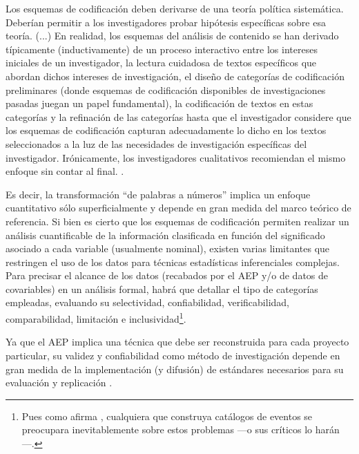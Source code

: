 \documentclass[letterpaper, 11pt]{book}
\theoremstyle{definition}
\theoremstyle{remark}
\begin{document}
\begin{center}
    \begin{minipage}{0.9\linewidth}
        {\setlength{\parindent}{12pt}\small
        Los esquemas de codificación deben derivarse de una teoría política sistemática. Deberían permitir a los investigadores probar hipótesis específicas sobre esa teoría. (...) En realidad, los esquemas del análisis de contenido se han derivado típicamente (inductivamente) de un proceso interactivo entre los intereses iniciales de un investigador, la lectura cuidadosa de textos específicos que abordan dichos intereses de investigación, el diseño de categorías de codificación preliminares (donde esquemas de codificación disponibles de investigaciones pasadas juegan un papel fundamental), la codificación de textos en estas categorías y la refinación de las categorías hasta que el investigador considere que los esquemas de codificación capturan adecuadamente lo dicho en los textos seleccionados a la luz de las necesidades de investigación específicas del investigador. Irónicamente, los investigadores cualitativos recomiendan el mismo enfoque sin contar al final. \normalsize \citep[34]{2010_Franzosi_QNA}.
        }
    \end{minipage}
\end{center}

Es decir, la transformación ``de palabras a números'' implica un enfoque cuantitativo sólo superficialmente y depende en gran medida del marco teórico de referencia. Si bien es cierto que los esquemas de codificación permiten realizar un análisis cuantificable de la información clasificada en función del significado asociado a cada variable (usualmente nominal), existen varias limitantes que restringen el uso de los datos para técnicas estadísticas inferenciales complejas. Para precisar el alcance de los datos (recabados por el AEP y/o de datos de covariables) en un análisis formal, habrá que detallar el tipo de categorías empleadas, evaluando su selectividad, confiabilidad, verificabilidad, comparabilidad, limitación e inclusividad\footnote{
    Pues como afirma \citet{2002_Tilly_EventCatalogsAsTheories}, cualquiera que construya catálogos de eventos se preocupara inevitablemente sobre estos problemas ---o sus críticos lo harán---.
}.

Ya que el AEP implica una técnica que debe ser reconstruida para cada proyecto particular, su validez y confiabilidad como método de investigación depende en gran medida de la implementación (y difusión) de estándares necesarios para su evaluación y replicación \citep[1]{2015_Lacy_BestContentAnalysis}.
\end{document}
